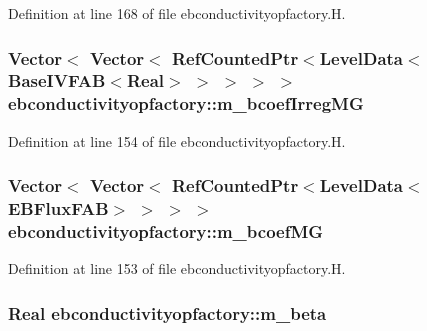 Definition at line 168 of file ebconductivityopfactory.\+H.

\subsubsection[{\texorpdfstring{m\+\_\+bcoef\+Irreg\+MG}{m_bcoefIrregMG}}]{\setlength{\rightskip}{0pt plus 5cm}Vector$<$ Vector$<$ Ref\+Counted\+Ptr$<$Level\+Data$<$Base\+I\+V\+F\+AB$<$Real$>$ $>$ $>$ $>$ $>$ ebconductivityopfactory\+::m\+\_\+bcoef\+Irreg\+MG\hspace{0.3cm}{\ttfamily [protected]}}\hypertarget{classebconductivityopfactory_af604655376de3ff931775817509fe6f3}{}\label{classebconductivityopfactory_af604655376de3ff931775817509fe6f3}


Definition at line 154 of file ebconductivityopfactory.\+H.

\subsubsection[{\texorpdfstring{m\+\_\+bcoef\+MG}{m_bcoefMG}}]{\setlength{\rightskip}{0pt plus 5cm}Vector$<$ Vector$<$ Ref\+Counted\+Ptr$<$Level\+Data$<$E\+B\+Flux\+F\+AB$>$ $>$ $>$ $>$ ebconductivityopfactory\+::m\+\_\+bcoef\+MG\hspace{0.3cm}{\ttfamily [protected]}}\hypertarget{classebconductivityopfactory_a477e84ef1342b8deb6f11ab6e9d7de34}{}\label{classebconductivityopfactory_a477e84ef1342b8deb6f11ab6e9d7de34}


Definition at line 153 of file ebconductivityopfactory.\+H.

\subsubsection[{\texorpdfstring{m\+\_\+beta}{m_beta}}]{\setlength{\rightskip}{0pt plus 5cm}Real ebconductivityopfactory\+::m\+\_\+beta\hspace{0.3cm}{\ttfamily [protected]}}\hypertarget{classebconductivityopfactory_abd680a52f1deeb0ef1ac89b0b8e0c64e}{}\label{classebconductivityopfactory_abd680a52f1deeb0ef1ac89b0b8e0c64e}


